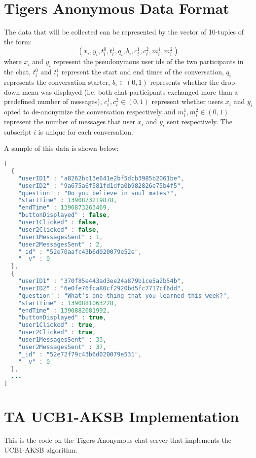 \section{Tigers Anonymous Data Format}
\label{sec:TADataFormat}

The data that will be collected can be represented by the vector of 10-tuples of the form: $$(x_i, y_i, t^0_i, t^1_i, q_i, b_i, c^1_i, c^2_i, m^1_i, m^2_i)$$ where $x_i$ and $y_i$ represent the pseudonymous user ids of the two participants in the chat, $t^0_i$ and $t^1_i$ represent the start and end times of the conversation, $q_i$ represents the conversation starter, $b_i \in {(0, 1)}$ represents whether the drop-down menu was displayed (i.e. both chat participants exchanged more than a predefined number of messages), $c^1_i, c^2_i \in{(0, 1)}$ represent whether users $x_i$ and $y_i$ opted to de-anonymize the conversation respectively and $m^1_i, m^2_i \in{(0,1)}$ represent the number of messages that user $x_i$ and $y_i$ sent respectively. The subscript $i$ is unique for each conversation. 

A sample of this data is shown below: 

\begin{lstlisting}[language=java]
[
  { 
    "userID1" : "a8262bb13e641e2bf5dcb3985b2061be",
    "userID2" : "9a675a6f581fd1dfa0b982826e75b4f5",
    "question" : "Do you believe in soul mates?",
    "startTime" : 1390873219878,
    "endTime" : 1390873263469,
    "buttonDisplayed" : false,
    "user1Clicked" : false,
    "user2Clicked" : false,
    "user1MessagesSent" : 1,
    "user2MessagesSent" : 2,
    "_id" : "52e70aafc43b6d020079e52e",
    "__v" : 0
  },
  {
    "userID1" : "370f85e443ad3ee24a879b1ce5a2b54b",
    "userID2" : "6e0fe76fca80cf2920bd5fc7717cf6dd",
    "question" : "What's one thing that you learned this week?",
    "startTime" : 1390881063228,
    "endTime" : 1390882681992,
    "buttonDisplayed" : true,
    "user1Clicked" : true,
    "user2Clicked" : true,
    "user1MessagesSent" : 33,
    "user2MessagesSent" : 37,
    "_id" : "52e72f79c43b6d020079e531",
    "__v" : 0 
  }, 
  ...
]
\end{lstlisting}

\section{TA UCB1-AKSB Implementation}

This is the code on the Tigers Anonymous chat server that implements the UCB1-AKSB algorithm.


